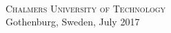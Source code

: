 \thispagestyle{empty}
\begin{center}
	\textbf{\Large\varHeadline} \\[1cm]
	{\large \varSubtitle}\\[1cm]

	\vfill	

	{\large \varNames}
	
	
	\varDepartment \\
	\textsc{Chalmers University of Technology} \\
	Gothenburg, Sweden, July 2017 \\
\end{center}

\newpage

\setlength{\parindent}{1cm}                         
